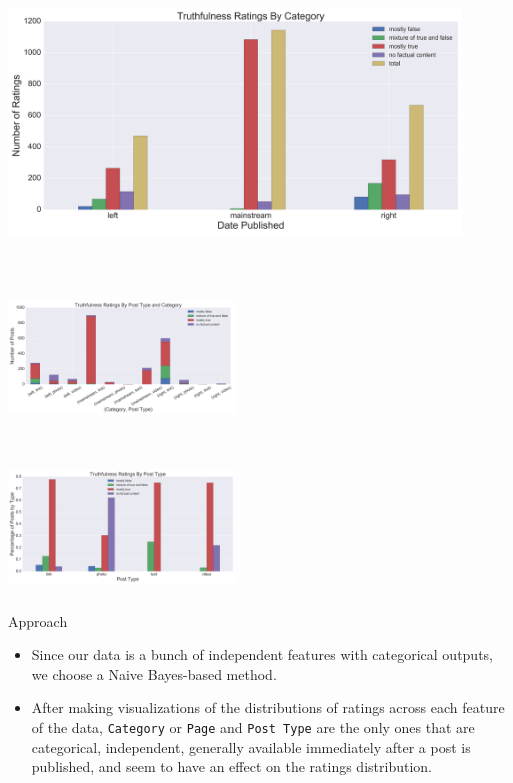 \documentclass[xcolor=dvipsnames, 14pt]{beamer}
\begin{document}
\begin{frame}
\centering
\includegraphics[width=12cm,height=7cm]{ratings_distribution_by_category.png}
\end{frame}

\begin{frame}
\centering
\includegraphics[width=6cm,height=4.5cm]{ratings_distribution_by_category_type.png}

\includegraphics[width=6cm,height=3.5cm]{ratings_distribution_by_type.png}
\end{frame}

\begin{frame}{Approach}
\begin{itemize}
\item Since our data is a bunch of independent features with categorical outputs, we choose a Naive Bayes-based method.
\item After making visualizations of the distributions of ratings across each feature of the data, \texttt{Category} or \texttt{Page} and \texttt{Post Type} are the only ones that are categorical, independent, generally available immediately after a post is published, and seem to have an effect on the ratings distribution.
\end{itemize}
\end{frame}
\end{document}
